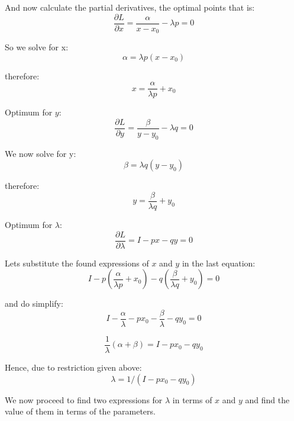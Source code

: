 \documentclass{article}
\begin{document}
And now calculate the partial derivatives, the optimal points that is:
\begin{equation}
  \frac{\partial L}{\partial x} = \frac{\alpha}{x - x_0} - \lambda p = 0
\end{equation}

So we solve for x:
\begin{equation}
  \alpha = \lambda p (x - x_0)
\end{equation}

therefore:
\begin{equation}
  x = \frac{\alpha}{\lambda p} + x_0
\end{equation}

Optimum for $y$:
\begin{equation}
  \frac{\partial L}{\partial y} = \frac{\beta}{y - y_0} - \lambda q = 0
\end{equation}

We now solve for y:
\begin{equation}
  \beta = \lambda q (y - y_0)
\end{equation}

therefore:
\begin{equation}
  y = \frac{\beta}{\lambda q} + y_0
\end{equation}

Optimum for $\lambda$:
\begin{equation}
  \frac{\partial L}{\partial \lambda} = I - px - qy = 0
\end{equation}

Lets substitute the found expressions of $x$ and $y$ in the last equation:
\begin{equation}
  I - p \left( \frac{\alpha}{\lambda p} + x_0 \right) - q \left( \frac{\beta}{\lambda q} + y_0 \right) = 0
\end{equation}

and do simplify:
\begin{equation}
  I - \frac{\alpha}{\lambda} - px_0 - \frac{\beta}{\lambda} - qy_0 = 0
\end{equation}

\begin{equation}
  \frac{1}{\lambda} (\alpha + \beta) = I - px_0 - qy_0
\end{equation}

Hence, due to restriction given above:
\begin{equation}\label{lam}
  \lambda = 1/(I - px_0 - qy_0)
\end{equation}

We now proceed to find two expressions for $\lambda$ in terms of $x$ and $y$ and find the value of them in terms of the parameters.
\end{document}

